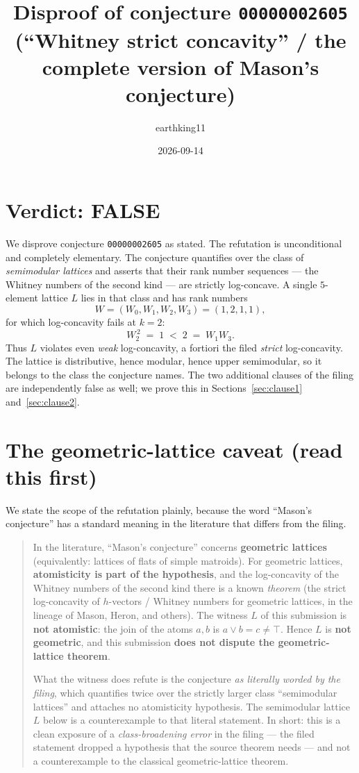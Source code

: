 \documentclass[11pt]{article}
\title{Disproof of conjecture \texttt{00000002605}\\[2pt]
\large (``Whitney strict concavity'' / the complete version of Mason's conjecture)}
\author{earthking11}
\date{2026-09-14}
\theoremstyle{definition}
\theoremstyle{remark}
\newcommand{\join}{\vee}
\begin{document}
\maketitle

\section*{Verdict: FALSE}

We disprove conjecture \texttt{00000002605} as stated. The refutation is
unconditional and completely elementary. The conjecture quantifies over the
class of \emph{semimodular lattices} and asserts that their rank number
sequences --- the Whitney numbers of the second kind --- are strictly
log-concave. A single $5$-element lattice $L$ lies in that class and has rank
numbers
\[
W = (W_0,W_1,W_2,W_3) = (1,2,1,1),
\]
for which log-concavity fails at $k=2$:
\[
W_2^{\,2} \;=\; 1 \;<\; 2 \;=\; W_1 W_3 .
\]
Thus $L$ violates even \emph{weak} log-concavity, a fortiori the filed
\emph{strict} log-concavity. The lattice is distributive, hence modular, hence
upper semimodular, so it belongs to the class the conjecture names. The two
additional clauses of the filing are independently false as well; we prove this
in Sections~\ref{sec:clause1} and~\ref{sec:clause2}.

\section{The geometric-lattice caveat (read this first)}\label{sec:caveat}

We state the scope of the refutation plainly, because the word
``Mason's conjecture'' has a standard meaning in the literature that differs
from the filing.

\begin{quote}
In the literature, ``Mason's conjecture'' concerns \textbf{geometric lattices}
(equivalently: lattices of flats of simple matroids). For geometric lattices,
\textbf{atomisticity is part of the hypothesis}, and the log-concavity of the
Whitney numbers of the second kind there is a known \emph{theorem}
(the strict log-concavity of $h$-vectors / Whitney numbers for geometric
lattices, in the lineage of Mason, Heron, and others). The witness $L$ of this
submission is \textbf{not atomistic}: the join of the atoms $a,b$ is
$a\join b = c \ne \top$. Hence $L$ is \textbf{not geometric}, and this
submission \textbf{does not dispute the geometric-lattice theorem}.

What the witness does refute is the conjecture \emph{as literally worded by the
filing}, which quantifies twice over the strictly larger class ``semimodular
lattices'' and attaches no atomisticity hypothesis. The semimodular lattice $L$
below is a counterexample to that literal statement. In short: this is a clean
exposure of a \emph{class-broadening error} in the filing --- the filed
statement dropped a hypothesis that the source theorem needs --- and not a
counterexample to the classical geometric-lattice theorem.
\end{quote}
\end{document}
